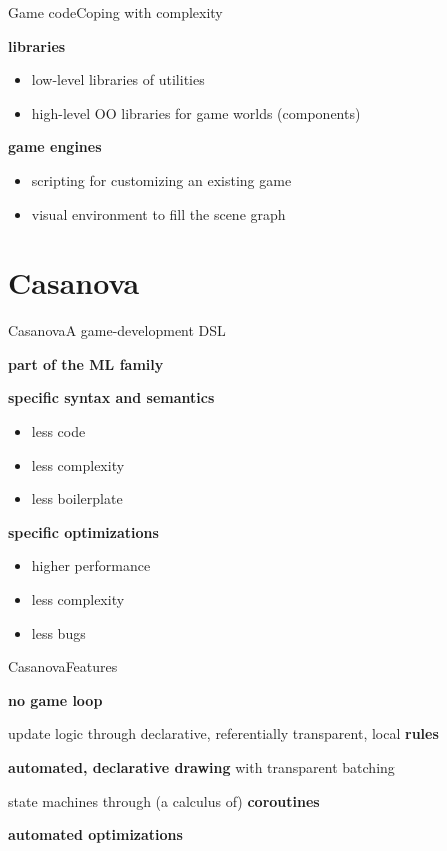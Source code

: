 \documentclass{beamer}
\begin{document}
\begin{slide}{Game code}{Coping with complexity}{
\item \textbf{libraries} 
\begin{itemize}
\item low-level libraries of utilities
\item high-level OO libraries for game worlds (components)
\end{itemize}
\item \textbf{game engines}
\begin{itemize}
\item scripting for customizing an existing game
\item visual environment to fill the scene graph
\end{itemize}
}\end{slide}

\section{Casanova}
\begin{slide}{Casanova}{A game-development DSL}{
\item \textbf{part of the ML family}
\item \textbf{specific syntax and semantics}
\begin{itemize}
\item less code
\item less complexity
\item less boilerplate
\end{itemize}
\item \textbf{specific optimizations}
\begin{itemize}
\item higher performance
\item less complexity
\item less bugs
\end{itemize}
}\end{slide}

\begin{slide}{Casanova}{Features}{
\item \textbf{no game loop}
\item update logic through declarative, referentially transparent, local \textbf{rules}
\item \textbf{automated, declarative drawing} with transparent batching
\item state machines through (a calculus of) \textbf{coroutines}
\item \textbf{automated optimizations}
}\end{slide}
\end{document}
